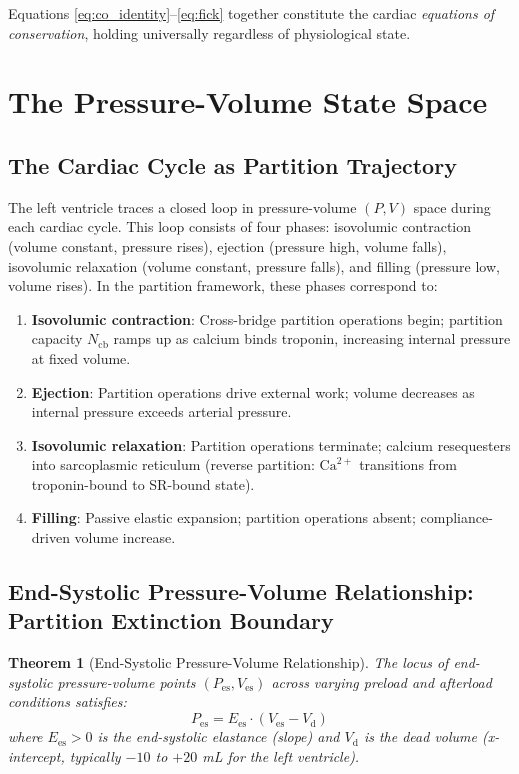 \documentclass[12pt,a4paper]{article}
\newtheorem{theorem}{Theorem}[section]
\theoremstyle{remark}
\newcommand{\Ees}{E_{\mathrm{es}}}
\newcommand{\Vd}{V_{\mathrm{d}}}
\newcommand{\Pes}{P_{\mathrm{es}}}
\newcommand{\Ncb}{N_{\mathrm{cb}}}
\begin{document}
Equations \ref{eq:co_identity}--\ref{eq:fick} together constitute the cardiac \textit{equations of conservation}, holding universally regardless of physiological state.

\section{The Pressure-Volume State Space}
\label{sec:pv}

\subsection{The Cardiac Cycle as Partition Trajectory}

The left ventricle traces a closed loop in pressure-volume $(P, V)$ space during each cardiac cycle. This loop consists of four phases: isovolumic contraction (volume constant, pressure rises), ejection (pressure high, volume falls), isovolumic relaxation (volume constant, pressure falls), and filling (pressure low, volume rises). In the partition framework, these phases correspond to:

\begin{enumerate}[label=(\roman*)]
    \item \textbf{Isovolumic contraction}: Cross-bridge partition operations begin; partition capacity $\Ncb$ ramps up as calcium binds troponin, increasing internal pressure at fixed volume.
    \item \textbf{Ejection}: Partition operations drive external work; volume decreases as internal pressure exceeds arterial pressure.
    \item \textbf{Isovolumic relaxation}: Partition operations terminate; calcium resequesters into sarcoplasmic reticulum (reverse partition: $\text{Ca}^{2+}$ transitions from troponin-bound to SR-bound state).
    \item \textbf{Filling}: Passive elastic expansion; partition operations absent; compliance-driven volume increase.
\end{enumerate}

\subsection{End-Systolic Pressure-Volume Relationship: Partition Extinction Boundary}

\begin{theorem}[End-Systolic Pressure-Volume Relationship]
\label{thm:espvr}
    The locus of end-systolic pressure-volume points $(P_{\mathrm{es}}, V_{\mathrm{es}})$ across varying preload and afterload conditions satisfies:
    \begin{equation}
        \boxed{\Pes = \Ees \cdot (V_{\mathrm{es}} - \Vd)}
        \label{eq:espvr}
    \end{equation}
    where $\Ees > 0$ is the end-systolic elastance (slope) and $\Vd$ is the dead volume (x-intercept, typically $-10$ to $+20$ mL for the left ventricle).
\end{theorem}
\end{document}
